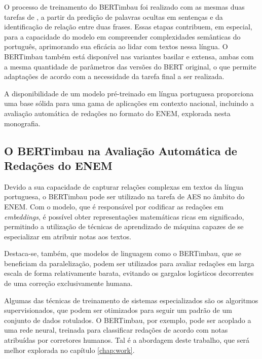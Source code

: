 O processo de treinamento do BERTimbau foi realizado com as mesmas duas tarefas de \citet{bert2018}, a partir da predição de palavras ocultas em sentenças e da identificação de relação entre duas frases. Essas etapas contribuem, em especial, para a capacidade do modelo em compreender complexidades semânticas do português, aprimorando sua eficácia ao lidar com textos nessa língua. O BERTimbau também está disponível nas variantes basilar e extensa, ambas com a mesma quantidade de parâmetros das versões do BERT original, o que permite adaptações de acordo com a necessidade da tarefa final a ser realizada.

A disponibilidade de um modelo pré-treinado em língua portuguesa proporciona uma base sólida para uma gama de aplicações em contexto nacional, incluindo a avaliação automática de redações no formato do ENEM, explorada nesta monografia.

\subsection{O BERTimbau na Avaliação Automática de Redações do ENEM}

Devido a sua capacidade de capturar relações complexas em textos da língua portuguesa, o BERTimbau pode ser utilizado na tarefa de AES no âmbito do ENEM. Com o modelo, que é responsável por codificar as redações em \textit{embeddings}, é possível obter representações matemáticas ricas em significado, permitindo a utilização de técnicas de aprendizado de máquina capazes de se especializar em atribuir notas aos textos.

Destaca-se, também, que modelos de linguagem como o BERTimbau, que se beneficiam da paralelização, podem ser utilizados para avaliar redações em larga escala de forma relativamente barata, evitando os gargalos logísticos decorrentes de uma correção exclusivamente humana.

Algumas das técnicas de treinamento de sistemas especializados são os algoritmos supervisionados, que podem ser otimizados para seguir um padrão de um conjunto de dados rotulados. O BERTimbau, por exemplo, pode ser acoplado a uma rede neural, treinada para classificar redações de acordo com notas atribuídas por corretores humanos. Tal é a abordagem deste trabalho, que será melhor explorada no capítulo \ref{chap:work}.
